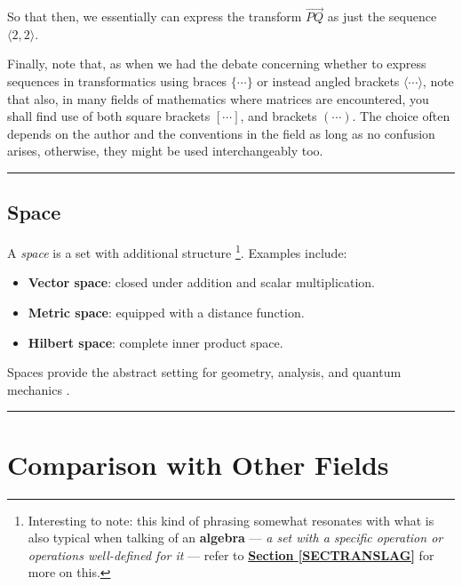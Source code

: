 \documentclass[a4paper, 18pt]{book} %
\begin{document}
\begin{appendices}
So that then, we essentially can express the transform $\overset{\rightarrow}{PQ}$ as just the sequence $\langle 2, 2 \rangle$.

\vspace{2em}

Finally, note that, as when we had the debate concerning whether to express sequences in transformatics using braces $\{ \cdots \}$ or instead angled brackets $\langle \cdots \rangle$, note that also, in many fields of mathematics where matrices are encountered, you shall find use of both square brackets $[ \cdots ]$, and brackets $( \cdots )$. The choice often depends on the author and the conventions in the field as long as no confusion arises, otherwise, they might be used interchangeably too.


\noindent\rule{\textwidth}{0.4pt}

\subsection*{Space}
A \emph{space} is a set with additional structure \cite{copilot_dna_assistant}\footnote{Interesting to note: this kind of phrasing somewhat resonates with what is also typical when talking of an \textbf{algebra} --- \textit{a set with a specific operation or operations well-defined for it} --- refer to \textbf{\hyperref[SECTRANSLAG]{Section \ref{SECTRANSLAG}}} for more on this.}. Examples include:
\begin{itemize}
  \item \textbf{Vector space}: closed under addition and scalar multiplication.
  \item \textbf{Metric space}: equipped with a distance function.
  \item \textbf{Hilbert space}: complete inner product space.
\end{itemize}
Spaces provide the abstract setting for geometry, analysis, and quantum mechanics \cite{kolmogorov1970introductory}.

\noindent\rule{\textwidth}{0.4pt}



\section{Comparison with Other Fields}


\end{appendices}
\end{document}
